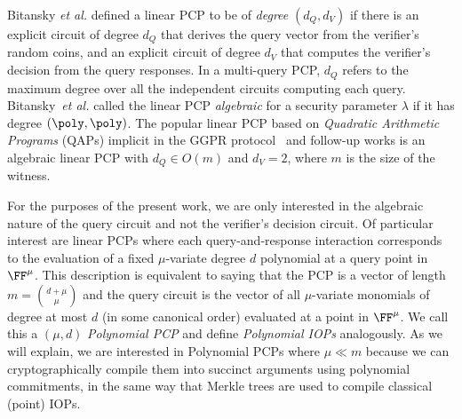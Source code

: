 Bitansky \emph{et al.} \cite{TCC:BCIOP13} defined a linear PCP to be of \emph{degree} $(d_Q, d_V)$ if there is an explicit circuit of degree $d_Q$ that derives the query vector from the verifier's random coins, and an explicit circuit of degree $d_V$ that computes the verifier's decision from the query responses. %
In a multi-query PCP, $d_Q$ refers to the maximum degree over all the independent circuits computing each query. Bitansky~\emph{et al.} called the linear PCP \emph{algebraic} for a security parameter $\lambda$ if it has degree $(\poly, \poly)$. The popular linear PCP based on \emph{Quadratic Arithmetic Programs} (QAPs) implicit in the GGPR protocol~\cite{EC:GGPR13} and follow-up works is an algebraic linear PCP with $d_Q \in O(m)$ and $d_V = 2$, where $m$ is the size of the witness.

For the purposes of the present work, we are only interested in the algebraic nature of the query circuit and not the verifier's decision circuit. Of particular interest are linear PCPs where each query-and-response interaction corresponds to the evaluation of a fixed $\mu$-variate degree $d$ polynomial at a query point in $\FF^\mu$. This description is equivalent to saying that the PCP is a vector of length $m = {d + \mu \choose \mu}$ and the query circuit is the vector of all $\mu$-variate monomials of degree at most $d$ (in some canonical order) evaluated at a point in $\FF^\mu$. We call this a $(\mu, d)$ \emph{Polynomial PCP} and define \emph{Polynomial IOPs} analogously. As we will explain, we are interested in Polynomial PCPs where $\mu \ll m$ because we can cryptographically compile them into succinct arguments using polynomial commitments, in the same way that Merkle trees are used to compile classical (point) IOPs. %

